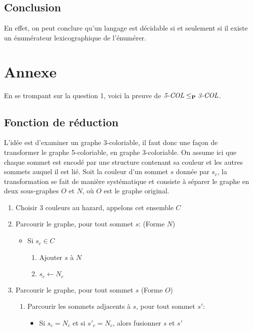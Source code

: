 \documentclass{article}
\newcommand\PP{{\normalfont{\textbf{P}}}}
\newcommand\col[1]{\textit{#1-COL}}
\begin{document}
\subsection{Conclusion}
En effet, on peut conclure qu’un langage est décidable si et seulement si il existe un énumérateur lexicographique de l'énumérer.

\pagebreak

\section{Annexe}
En se trompant sur la question 1, voici la preuve de $\col{5} \leq_\PP \col{3}$.

\subsection{Fonction de réduction}
L'idée est d'examiner un graphe 3-coloriable, il faut donc une façon de transformer le graphe 5-coloriable, en graphe 3-coloriable. On assume ici que chaque sommet est encodé par une structure contenant sa couleur et les autres sommets auquel il est lié. Soit la couleur d'un sommet $s$ donnée par $s_c$, la transformation se fait de manière systématique et consiste à séparer le graphe en deux sous-graphes $O$ et $N$, où $O$ est le graphe original.

\vspace{1cm}
\begin{tcolorbox}
  \begin{enumerate}
  \item Choisir 3 couleurs au hazard, appelons cet ensemble $C$
  \item Parcourir le graphe, pour tout sommet $s$: (Forme $N$)
    \begin{itemize}
    \item Si $s_c \in C$
      \begin{enumerate}
      \item Ajouter $s$ à $N$
      \item $s_c \leftarrow N_c$
      \end{enumerate}
    \end{itemize}
  \item Parcourir le graphe, pour tout sommet $s$ (Forme $O$)
    \begin{enumerate}
    \item Parcourir les sommets adjacents à $s$, pour tout sommet $s'$:
      \begin{itemize}
      \item Si $s_c = N_c$ et si $s'_c = N_c$, alors fusionner $s$ et $s'$
      \end{itemize}
    \end{enumerate}
  \end{enumerate}
\end{tcolorbox}
\vspace{1cm}
\end{document}
